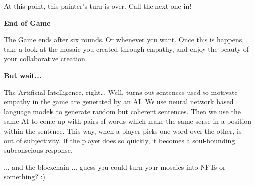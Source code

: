 \documentclass[twocolumn]{article}
\newcommand{\lvl}[1]{\vspace{0.5cm}\Large{\textbf{#1}}\vspace{0.2cm}}
\begin{document}
\vspace{0.5cm}At this point, this painter's turn is over. Call the next one in!




\lvl{End of Game}

The Game ends after six rounds. Or whenever you want. Once this is happens, take a look at the mosaic you created through empathy, and enjoy the beauty of your collaborative creation.



\lvl{But wait...}

The Artificial Intelligence, right... Well, turns out sentences used to motivate empathy in the game are generated by an AI. We use neural network based language models to generate random but coherent sentences. Then we use the same AI to come up with pairs of words which make the same sense in a position within the sentence. This way, when a player picks one word over the other, is out of subjectivity. If the player does so quickly, it becomes a soul-bounding subconscious response.

... and the blockchain ... guess you could turn your mosaics into NFTs or something? :)
% 
% 
\end{document}
